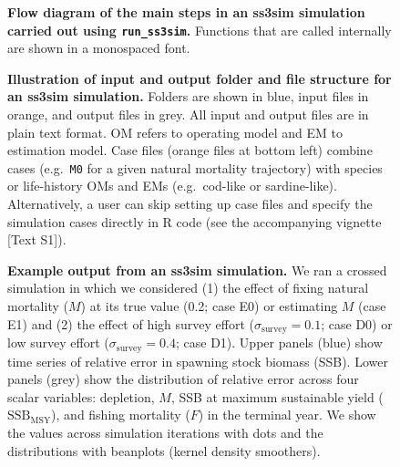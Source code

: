 \begin{figure}[!ht]
 \begin{center}
 \end{center}
\caption{
{\bf Flow diagram of the main steps in an ss3sim simulation carried out using
  \texttt{run\_ss3sim}.} Functions that are called internally are shown in a
monospaced font.
}
\label{fig:sim-steps}
\end{figure}


\begin{figure}[!ht]
 \begin{center}
 \end{center}
\caption{
{\bf Illustration of input and output folder and file structure for an ss3sim
  simulation.} Folders are shown in blue, input files in orange, and output
files in grey. All input and output files are in plain text format. OM refers
to operating model and EM to estimation model. Case files (orange files at
bottom left) combine cases (e.g.~\texttt{M0} for a given natural mortality
trajectory) with species or life-history OMs and EMs (e.g.~cod-like or
sardine-like). Alternatively, a user can skip setting up case files and specify
the simulation cases directly in \textsf{R} code (see the accompanying vignette
[Text S1]).
}
\end{figure}


\begin{figure}[!ht]
 \begin{center}
 \end{center}
\caption{
{\bf Example output from an ss3sim simulation.} We ran a crossed simulation in
which we considered (1) the effect of fixing natural mortality ($M$) at its
true value (0.2; case E0) or estimating $M$ (case E1) and (2) the effect of
high survey effort ($\sigma_\mathrm{survey} = 0.1$; case D0) or low survey
effort ($\sigma_\mathrm{survey} = 0.4$; case D1). Upper panels (blue) show time
series of relative error in spawning stock biomass (SSB). Lower panels (grey)
show the distribution of relative error across four scalar variables:
depletion, $M$, SSB at maximum sustainable yield ($\mathrm{SSB}_\mathrm{MSY}$),
and fishing mortality ($F$) in the terminal year. We show the values across
simulation iterations with dots and the distributions with beanplots (kernel
density smoothers).
}
\label{fig:results}
\end{figure}

